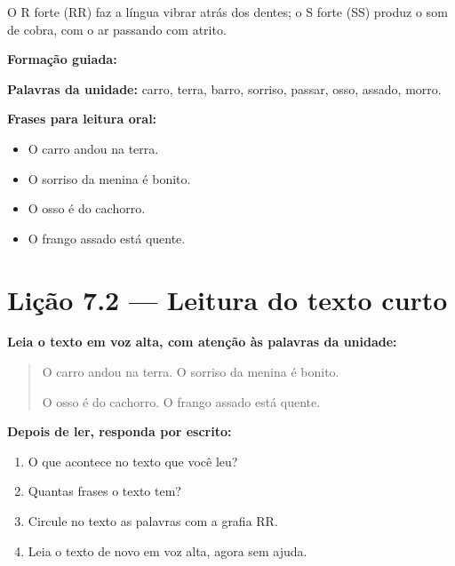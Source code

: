 \begin{boquinha}
O R forte (RR) faz a língua vibrar atrás dos dentes; o S forte (SS) produz o som de cobra, com o ar passando com atrito.
\end{boquinha}

\noindent\textbf{Formação guiada:}

\begin{center}
\end{center}

\noindent\textbf{Palavras da unidade:} carro, terra, barro, sorriso, passar, osso, assado, morro.

\noindent\textbf{Frases para leitura oral:}
\begin{itemize}[leftmargin=1.6em]
  \item O carro andou na terra.
  \item O sorriso da menina é bonito.
  \item O osso é do cachorro.
  \item O frango assado está quente.
\end{itemize}

\section{Lição 7.2 --- Leitura do texto curto}

\noindent\textbf{Leia o texto em voz alta, com atenção às palavras da unidade:}


\begin{quote}
O carro andou na terra. O sorriso da menina é bonito.

O osso é do cachorro. O frango assado está quente.
\end{quote}

\textbf{Depois de ler, responda por escrito:}
\begin{enumerate}

  \item O que acontece no texto que você leu?
  \begin{center}
  \underline{\hspace{12cm}}
  \end{center}

  \item Quantas frases o texto tem?
  \begin{center}
  \underline{\hspace{12cm}}
  \end{center}

  \item Circule no texto as palavras com a grafia RR.

  \item Leia o texto de novo em voz alta, agora sem ajuda.

\end{enumerate}

